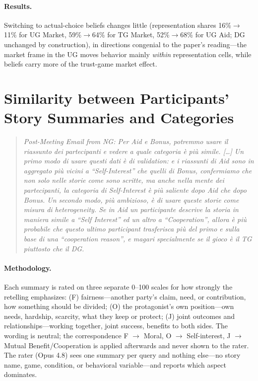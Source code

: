 \documentclass[11pt]{article}
\begin{document}
\paragraph{Results.} Switching to actual-choice beliefs changes little
(representation shares 16\%$\to$11\% for UG Market, 59\%$\to$64\% for TG Market,
52\%$\to$68\% for UG Aid; DG unchanged by construction), in directions congenial to
the paper's reading---the market frame in the UG moves behavior mainly \emph{within}
representation cells, while beliefs carry more of the trust-game market effect.

\section{Similarity between Participants' Story Summaries and Categories}

\begin{quote}\itshape
Post-Meeting Email from NG: Per Aid e Bonus, potremmo usare il riassunto dei partecipanti
e vedere a quale categoria \`e pi\`u simile. [\ldots] Un primo modo di usare questi
dati \`e di validation: e i riassunti di Aid sono in aggregato pi\`u vicini a
``Self-Interest'' che quelli di Bonus, confermiamo che non solo nelle storie come sono
scritte, ma anche nella mente dei partecipanti, la categoria di Self-Interest \`e pi\`u
saliente dopo Aid che dopo Bonus\@. Un secondo modo, pi\`u ambizioso, \`e di usare queste
storie come misura di heterogeneity. Se in Aid un participante descrive la storia in
maniera simile a ``Self Interest'' ed un altro a ``Cooperation'', allora \`e pi\`u
probabile che questo ultimo participant trasferisca pi\`u del primo e sulla base di una
``cooperation reason'', e magari specialmente se il gioco \`e il TG piuttosto che il
DG\@.
\end{quote}


\paragraph{Methodology.} Each summary is rated on three separate 0--100 scales for how
strongly the retelling emphasizes: (F) fairness---another party's claim,
need, or contribution, how something should be divided; (O) the protagonist's own
position---own needs, hardship, scarcity, what they keep or protect; (J) joint outcomes
and relationships---working together, joint success, benefits to both sides. The wording
is neutral; the correspondence F $\to$ Moral, O $\to$ Self-interest, J $\to$ Mutual
Benefit/Cooperation is applied afterwards and never shown to the rater. The rater (Opus
4.8) sees one summary per query
and nothing else---no story name, game, condition, or behavioral variable---and
reports which aspect dominates. 
\end{document}
